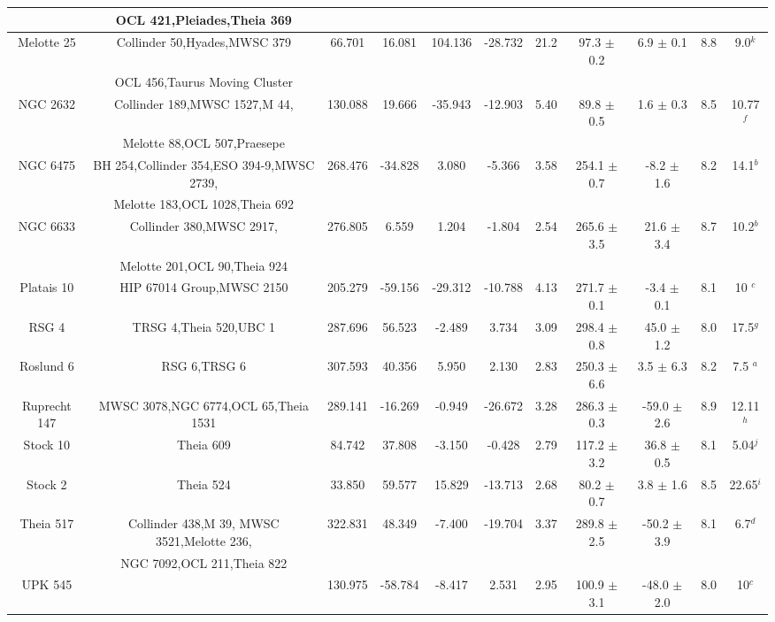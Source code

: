 \documentclass{aa}
\begin{document}
\begin{appendix}
\begin{landscape}
\begin{table}
\begin{tabular}{c c c c c c c c c c c}
               & OCL 421,Pleiades,Theia 369 & \\
\hline
    Melotte 25 & Collinder 50,Hyades,MWSC 379 & 66.701  & 16.081  & 104.136 & -28.732   & 21.2 & 97.3 $\pm$ 0.2 & 6.9 $\pm$ 0.1 & 8.8 & 9.0$^k$\\
               & OCL 456,Taurus Moving Cluster & \\
\hline
    NGC 2632 & Collinder 189,MWSC 1527,M 44,  & 130.088   & 19.666  & -35.943   & -12.903    & 5.40 & 89.8 $\pm$ 0.5 & 1.6 $\pm$ 0.3  & 8.5 & 10.77$^f$\\               &Melotte 88,OCL 507,Praesepe  & \\
\hline    
    NGC 6475 & BH 254,Collinder 354,ESO 394-9,MWSC 2739,  & 268.476   & -34.828 & 3.080    & -5.366    & 3.58 & 254.1 $\pm$ 0.7 & -8.2 $\pm$ 1.6 & 8.2 & 14.1$^b$\\
               & Melotte 183,OCL 1028,Theia 692 & \\
\hline
    NGC 6633 & Collinder 380,MWSC 2917, & 276.805   & 6.559   & 1.204    & -1.804     & 2.54 & 265.6 $\pm$ 3.5 & 21.6 $\pm$ 3.4  & 8.7 & 10.2$^b$\\
             & Melotte 201,OCL 90,Theia 924   & \\ 
\hline               
    Platais 10 &HIP 67014 Group,MWSC 2150 & 205.279   & -59.156 & -29.312   & -10.788    & 4.13 & 271.7 $\pm$ 0.1   & -3.4 $\pm$ 0.1 &  8.1 & 10 $^c$\\    
\hline
    RSG 4 & TRSG 4,Theia 520,UBC 1  & 287.696   & 56.523  & -2.489     & 3.734    & 3.09 & 298.4 $\pm$ 0.8 & 45.0 $\pm$ 1.2 &   8.0& 17.5$^g$\\    
\hline    
    Roslund 6 & RSG 6,TRSG 6 & 307.593   & 40.356  & 5.950     & 2.130    & 2.83 & 250.3 $\pm$ 6.6   & 3.5 $\pm$ 6.3 & 8.2 & 7.5 $^a$\\

\hline    
    Ruprecht 147& MWSC 3078,NGC 6774,OCL 65,Theia 1531  & 289.141   & -16.269 & -0.949   & -26.672    & 3.28 & 286.3 $\pm$ 0.3 & -59.0 $\pm$ 2.6 &  8.9 &  12.11$^h$\\
\hline    
    Stock 10 &Theia 609 & 84.742    & 37.808  & -3.150    & -0.428    & 2.79 & 117.2 $\pm$ 3.2 & 36.8 $\pm$ 0.5  & 8.1 & 5.04$^j$\\
\hline    
    Stock 2   & Theia 524  & 33.850   & 59.577  & 15.829 & -13.713  & 2.68 & 80.2 $\pm$ 0.7 & 3.8 $\pm$ 1.6 &  8.5 & 22.65$^i$\\
\hline
    Theia 517 & Collinder 438,M 39, MWSC 3521,Melotte 236,& 322.831   & 48.349  & -7.400   & -19.704    & 3.37 & 289.8 $\pm$ 2.5  & -50.2 $\pm$ 3.9   & 8.1 & 6.7$^d$\\
             & NGC 7092,OCL 211,Theia 822  & \\
\hline    
    UPK 545 &  & 130.975   & -58.784 & -8.417     & 2.531    & 2.95 & 100.9 $\pm$ 3.1 & -48.0 $\pm$ 2.0 & 8.0 & 10$^c$\\
    

\end{tabular}
\end{table}
\end{landscape}
\end{appendix}
\end{document}
